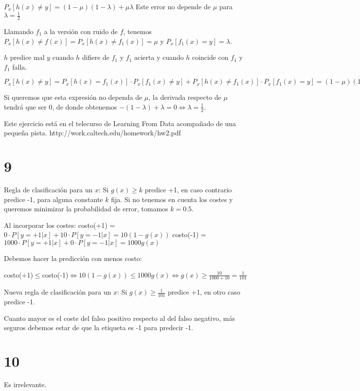 \documentclass{article}
\begin{document}
\( P_x[h(x)\neq y]=(1-\mu)(1-\lambda)+\mu\lambda \)
Este error no depende de \( \mu \) para \( \lambda =\frac{1}{2}\)

Llamando \(f_1\) a la versión con ruido de \(f\), tenemos
\(P_x[h(x)\neq f(x)]=P_x[h(x)\neq f_1(x)]=\mu\) y
\(P_x[f_1(x)=y]=\lambda\).

\(h\) predice mal \(y\) cuando \(h\) difiere de \(f_1\) y \(f_1\)
acierta y cuando \(h\) coincide con \(f_1\) y \(f_1\) falla.

\( P_x[h(x)\neq y]=P_x[h(x)=f_1(x)]\cdot P_x[f_1(x)\neq y]+P_x[h(x)\neq f_1(x)]\cdot P_x[f_1(x)=y] = (1-\mu)(1-\lambda)+\mu\lambda \)

Si queremos que esta expresión no dependa de \( \mu \), la derivada
respecto de \( \mu \) tendrá que ser 0, de donde obtenemos
\( -(1-\lambda)+\lambda = 0 \Leftrightarrow \lambda = \frac{1}{2} \).


Este ejercicio está en el telecurso de Learning From Data acompañado
de una pequeña pista.  http://work.caltech.edu/homework/hw2.pdf

\section{9}

Regla de clasificación para un \(x\): Si
\(g(x)\geq k\) predice +1, en caso contrario predice -1, para
alguna constante \(k\) fija. Si no tenemos en cuenta los costes y
queremos minimizar la probabilidad de error, tomamos \(k=0.5\).

Al incorporar los costes:
costo(+1) = \(0\cdot P[y=+1|x]+10\cdot P[y=-1|x]=10 (1-g(x))\)
costo(-1) = \( 1000\cdot P[y=+1|x]+0\cdot P[y=-1|x]=1000 g(x) \)

Debemos hacer la predicción con menos costo:

costo(+1)\(\leq\)costo(-1)\(\Leftrightarrow 10(1-g(x))\leq 1000g(x)\Leftrightarrow g(x)\geq\frac{10}{1000+10}=\frac{1}{101}\)

Nueva regla de clasificación para un \(x\):
Si \(g(x)\geq \frac{1}{101}\) predice +1, en otro caso predice -1.

Cuanto mayor es el coste del falso positivo respecto al del falso
negativo, más seguros debemos estar de que la etiqueta es -1 para
predecir -1.

\section{10}

Es irrelevante.
\end{document}
